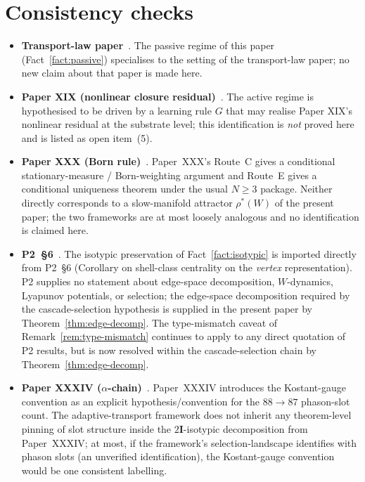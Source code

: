 \documentclass[11pt]{article}
\theoremstyle{definition}
\newcommand{\twoI}{2\mathbf{I}}
\begin{document}
\section{Consistency checks}\label{sec:consistency}

\begin{itemize}
    \item \textbf{Transport-law paper}~\citep{SmartTransportLaw}. The passive regime of this paper (Fact~\ref{fact:passive}) specialises to the setting of the transport-law paper; no new claim about that paper is made here.
    \item \textbf{Paper XIX (nonlinear closure residual)}~\citep{SmartXIX}. The active regime is hypothesised to be driven by a learning rule $G$ that may realise Paper XIX's nonlinear residual at the substrate level; this identification is \emph{not} proved here and is listed as open item~(5).
    \item \textbf{Paper XXX (Born rule)}~\citep{SmartXXX}. Paper~XXX's Route~C gives a conditional stationary-measure / Born-weighting argument and Route~E gives a conditional uniqueness theorem under the usual $N \geq 3$ package. Neither directly corresponds to a slow-manifold attractor $\rho^*(W)$ of the present paper; the two frameworks are at most loosely analogous and no identification is claimed here.
    \item \textbf{P2~\S 6}~\citep{CascadeAlgSubstrate}. The isotypic preservation of Fact~\ref{fact:isotypic} is imported directly from P2~\S 6 (Corollary on shell-class centrality on the \emph{vertex} representation). P2 supplies no statement about edge-space decomposition, $W$-dynamics, Lyapunov potentials, or selection; the edge-space decomposition required by the cascade-selection hypothesis is supplied in the present paper by Theorem~\ref{thm:edge-decomp}. The type-mismatch caveat of Remark~\ref{rem:type-mismatch} continues to apply to any direct quotation of P2 results, but is now resolved within the cascade-selection chain by Theorem~\ref{thm:edge-decomp}.
    \item \textbf{Paper XXXIV ($\alpha$-chain)}~\citep{SmartXXXIV}. Paper~XXXIV introduces the Kostant-gauge convention as an explicit hypothesis/convention for the $88 \to 87$ phason-slot count. The adaptive-transport framework does not inherit any theorem-level pinning of slot structure inside the $\twoI$-isotypic decomposition from Paper~XXXIV; at most, if the framework's selection-landscape identifies with phason slots (an unverified identification), the Kostant-gauge convention would be one consistent labelling.

\end{itemize}
\end{document}
